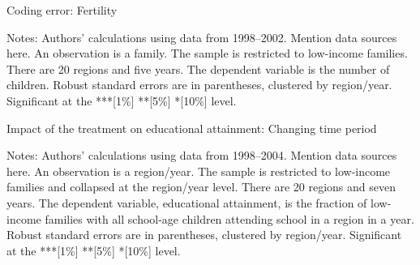 \documentclass[12pt,a4paper]{article}
\begin{document}
\begin{footnotesize}


\begin{table}[H]
   \centering
   \caption{Coding error: Fertility} \label{tab:table1}
   \begin{threeparttable}
         \footnotesize 
     
        \begin{tablenotes}
        \scriptsize 
        \item{Notes: Authors’ calculations using data from 1998--2002. Mention data sources here. An observation is a family. The sample is restricted to low-income families. There are 20 regions and five years. The dependent variable is the number of children. Robust standard errors are in parentheses, clustered by region/year. Significant at the ***[1\%] **[5\%] *[10\%] level.
}
        \end{tablenotes}  
   \end{threeparttable}                          
\end{table}


\begin{table}[H]
   \centering
   \caption{Impact of the treatment on educational attainment: Changing time period} \label{tab:table2}
   \begin{threeparttable}
         \footnotesize 
     
        \begin{tablenotes}
        \scriptsize 
        \item{Notes: Authors’ calculations using data from 1998--2004. Mention data sources here. An observation is a region/year. The sample is restricted to low-income families and collapsed at the region/year level. There are 20 regions and seven years. The dependent variable, educational attainment, is the fraction of low-income families with all school-age children attending school in a region in a year. Robust standard errors are in parentheses, clustered by region/year. Significant at the ***[1\%] **[5\%] *[10\%] level.
}
        \end{tablenotes}  
   \end{threeparttable}                          
\end{table}



\end{footnotesize}
\end{document}
